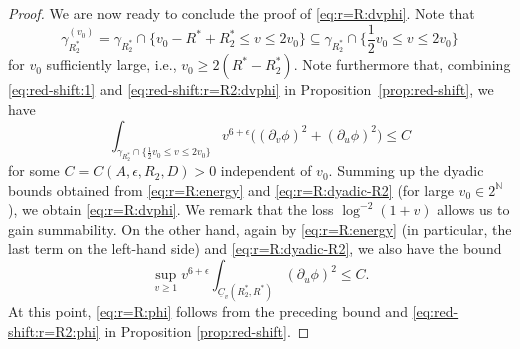 \documentclass[12 pt, reqno]{amsart}
\theoremstyle{definition}
\theoremstyle{remark}
\numberwithin{equation}{section}
\newcommand{\set}[1]{\{#1\}}
\newcommand{\rd}{\partial}
\newcommand{\0}{\emptyset}
\newcommand{\gmm}{\gamma}
\newcommand{\eps}{\epsilon}
\newcommand{\bbN}{\mathbb N}
\newcommand{\uC}{\underline{C}}
\begin{document}
\begin{proof}
We are now ready to conclude the proof of \eqref{eq:r=R:dvphi}. Note that 
\begin{equation*}
	\gmm^{(v_{0})}_{R^{\ast}_{2}} = \gmm_{R^{\ast}_{2}} \cap \set{ v_{0} - R^{\ast} + R^{\ast}_{2} \leq v \leq 2v_{0}} 
	\subseteq \gmm_{R^{\ast}_{2}} \cap \set{ \frac{1}{2}v_{0} \leq v \leq 2v_{0}} 
\end{equation*}
for $v_{0}$ sufficiently large, i.e., $v_{0} \geq 2 (R^{\ast} - R^{\ast}_{2})$. 
Note furthermore that, combining \eqref{eq:red-shift:1} and \eqref{eq:red-shift:r=R2:dvphi} in Proposition~\ref{prop:red-shift}, we have
\begin{equation} \label{eq:r=R:dyadic-R2}
	\int_{\gmm_{R^{\ast}_{2}} \cap \set{\frac{1}{2} v_{0} \leq v \leq 2v_{0}}} v^{6+\eps} \big( (\rd_{v} \phi)^{2} + (\rd_{u} \phi)^{2} \big) \leq C
\end{equation}
for some $C = C(A, \eps, R_{2}, D) > 0$ independent of $v_{0}$. Summing up the dyadic bounds obtained from \eqref{eq:r=R:energy} and \eqref{eq:r=R:dyadic-R2} (for large $v_{0} \in 2^{\bbN}$), we obtain \eqref{eq:r=R:dvphi}. We remark that the loss $\log^{-2}(1+v)$ allows us to gain summability. On the other hand, again by \eqref{eq:r=R:energy} (in particular, the last term on the left-hand side) and \eqref{eq:r=R:dyadic-R2}, we also have the bound
\begin{equation*}
	\sup_{v \geq 1} v^{6+\eps} \int_{\uC_{v}(R^{\ast}_{2}, R^{\ast})} (\rd_{u} \phi)^{2} \leq C.
\end{equation*}
At this point, \eqref{eq:r=R:phi} follows from the preceding bound and \eqref{eq:red-shift:r=R2:phi} in Proposition \ref{prop:red-shift}. \qedhere

%
\end{proof}
\end{document}
